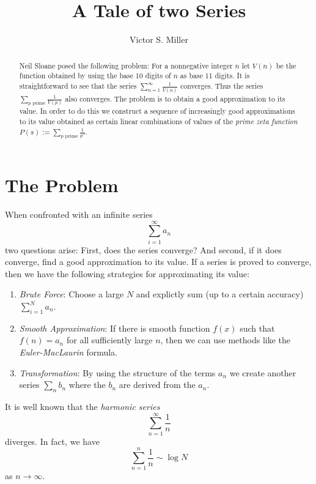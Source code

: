 \documentclass{article}
\title{A Tale of two Series}
\author{Victor S. Miller}
\begin{document}
\maketitle
\begin{abstract}
  Neil Sloane posed the following problem: For a nonnegative integer
  $n$ let $V(n)$ be the function obtained by using the base 10 digits
  of $n$ as base 11 digits. It is straightforward to see that the
  series $\sum_{n=1}^\infty \frac{1}{V(n)}$ converges. Thus the series
  $\sum_{p \text{ prime}} \frac{1}{V(p)}$ also converges. The problem
  is to obtain a good approximation to its value. In order to do this
  we construct a sequence of increasingly good approximations to its
  value obtained as certain linear combinations of values of the
  \emph{prime zeta function}
  $P(s) := \sum_{p \text{ prime}} \frac{1}{p^s}$.
\end{abstract}

\section{The Problem}
\label{sec:problem}

When confronted with an infinite series
$$\sum_{i=1}^\infty a_n$$
two questions arise: First, does the series converge? And second, if
it does converge, find a good approximation to its value. If a series
is proved to converge, then we have the following strategies for
approximating its value:

\begin{enumerate}
\item \emph{Brute Force}: Choose a large $N$ and explictly sum (up to a
  certain accuracy) $\sum_{i=1}^N a_n$.
\item \emph{Smooth Approximation}: If there is smooth function $f(x)$
  such that $f(n) = a_n$ for all sufficiently large $n$, then we can
  use methods like
  the \emph{Euler-MacLaurin} formula.
\item \emph{Transformation}: By using the structure of the terms $a_n$
  we create another series $\sum_n b_n$ where the $b_n$ are derived
  from the $a_n$.
\end{enumerate}

It is well known that the \emph{harmonic series}
\begin{displaymath}
  \sum_{n=1}^\infty \frac{1}{n}
\end{displaymath}
diverges. In fact, we have
\begin{displaymath}
  \sum_{n=1}^n \frac{1}{n} \sim \log N
\end{displaymath}
as $n \rightarrow \infty$.
\end{document}
